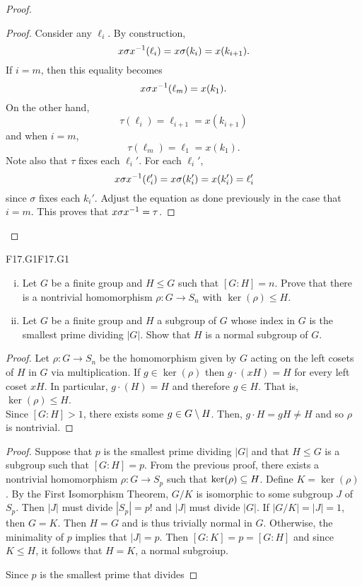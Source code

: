 \documentclass[../AlgebraQualSolutions.tex]{subfiles}
\begin{document}
\begin{proof}
\begin{claim}
\begin{proof}
        Consider any $\ell_i$. By construction,
            \[x\sigma x^{-1}(\ell_i) = x\sigma(k_i) = x(k_{i+1}).\]
        If $i = m$, then this equality becomes
            \[x \sigma x^{-1}(\ell_m) = x(k_1).\]
        On the other hand,
            \[\tau(\ell_i) = \ell_{i+1} = x(k_{i+1})\]
        and when $i = m$,
            \[\tau(\ell_m) = \ell_1 = x(k_1).\]
        Note also that $\tau$ fixes each $\ell_i'$. For each $\ell_i'$,
            \[x\sigma x^{-1}(\ell_i') = x\sigma(k_i') = x(k_i') = \ell_i'\]
        since $\sigma$ fixes each $k_i'$. Adjust the equation as done previously in the case that $i = m$. This proves that $x\sigma x^{-1} = \tau$.
    \end{proof}
\end{claim}
\end{proof}


\begin{prob}{F17.G1}{F17.G1}
    \begin{enumerate}[(i)]
        \item Let $G$ be a finite group and $H \leq G$ such that $[G:H] = n$. Prove that there is a nontrivial homomorphism $\rho: G \to S_n$ with $\ker(\rho)\leq H$.
        \item Let $G$ be a finite group and $H$ a subgroup of $G$ whose index in $G$ is the smallest prime dividing $|G|$. Show that $H$ is a normal subgroup of $G$.
    \end{enumerate}
\end{prob}

\begin{proof}
    Let $\rho: G \to S_n$ be the homomorphism given by $G$ acting on the left cosets of $H$ in $G$ via multiplication. If $g \in \ker(\rho)$ then $g\cdot(xH) = H$ for every left coset $xH$. In particular, $g\cdot(H) = H$ and therefore $g \in H$. That is, $\ker(\rho) \leq H$.\\

    Since $[G:H] > 1$, there exists some $g \in G\setminus H$. Then, $g\cdot H = gH \neq H$ and so $\rho$ is nontrivial.
\end{proof}

\begin{proof}
    Suppose that $p$ is the smallest prime dividing $|G|$ and that $H \leq G$ is a subgroup such that $[G:H] = p$. From the previous proof, there exists a nontrivial homomorphism $\rho: G \to S_p$ such that $\ker(\rho) \subseteq H$. Define $K = \ker(\rho)$. By the First Isomorphism Theorem, $G/K$ is isomorphic to some subgroup $J$ of $S_p$. Then $|J|$ must divide $|S_p| = p!$ and $|J|$ must divide $|G|$. If $|G/K| = |J| = 1$, then $G = K$. Then $H = G$ and is thus trivially normal in $G$. Otherwise, the minimality of $p$ implies that $|J| = p$. Then $[G:K] = p = [G:H]$ and since $K \leq H$, it follows  that $H = K$, a normal subgroiup.
    
    Since $p$ is the smallest prime that divides 
\end{proof}
\end{document}

